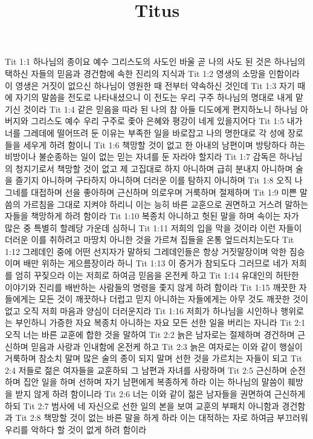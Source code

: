 

\title{Titus}

Tit 1:1  하나님의 종이요 예수 그리스도의 사도인 바울 곧 나의 사도 된 것은 하나님의 택하신 자들의 믿음과 경건함에 속한 진리의 지식과
Tit 1:2  영생의 소망을 인함이라 이 영생은 거짓이 없으신 하나님이 영원한 때 전부터 약속하신 것인데
Tit 1:3  자기 때에 자기의 말씀을 전도로 나타내셨으니 이 전도는 우리 구주 하나님의 명대로 내게 맡기신 것이라
Tit 1:4  같은 믿음을 따라 된 나의 참 아들 디도에게 편지하노니 하나님 아버지와 그리스도 예수 우리 구주로 좇아 은혜와 평강이 네게 있을지어다
Tit 1:5  내가 너를 그레데에 떨어뜨려 둔 이유는 부족한 일을 바로잡고 나의 명한대로 각 성에 장로들을 세우게 하려 함이니
Tit 1:6  책망할 것이 없고 한 아내의 남편이며 방탕하다 하는 비방이나 불순종하는 일이 없는 믿는 자녀를 둔 자라야 할지라
Tit 1:7  감독은 하나님의 청지기로서 책망할 것이 없고 제 고집대로 하지 아니하며 급히 분내지 아니하며 술을 즐기지 아니하며 구타하지 아니하며 더러운 이를 탐하지 아니하며
Tit 1:8  오직 나그네를 대접하며 선을 좋아하며 근신하며 의로우며 거룩하며 절제하며
Tit 1:9  미쁜 말씀의 가르침을 그대로 지켜야 하리니 이는 능히 바른 교훈으로 권면하고 거스려 말하는 자들을 책망하게 하려 함이라
Tit 1:10  복종치 아니하고 헛된 말을 하며 속이는 자가 많은 중 특별히 할례당 가운데 심하니
Tit 1:11  저희의 입을 막을 것이라 이런 자들이 더러운 이를 취하려고 마땅치 아니한 것을 가르쳐 집들을 온통 엎드러치는도다
Tit 1:12  그레데인 중에 어떤 선지자가 말하되 그레데인들은 항상 거짓말장이며 악한 짐승이며 배만 위하는 게으름장이라 하니
Tit 1:13  이 증거가 참되도다 그러므로 네가 저희를 엄히 꾸짖으라 이는 저희로 하여금 믿음을 온전케 하고
Tit 1:14  유대인의 허탄한 이야기와 진리를 배반하는 사람들의 명령을 좇지 않게 하려 함이라
Tit 1:15  깨끗한 자들에게는 모든 것이 깨끗하나 더럽고 믿지 아니하는 자들에게는 아무 것도 깨끗한 것이 없고 오직 저희 마음과 양심이 더러운지라
Tit 1:16  저희가 하나님을 시인하나 행위로는 부인하니 가증한 자요 복종치 아니하는 자요 모든 선한 일을 버리는 자니라
Tit 2:1  오직 너는 바른 교훈에 합한 것을 말하여
Tit 2:2  늙은 남자로는 절제하며 경건하며 근신하며 믿음과 사랑과 인내함에 온전케 하고
Tit 2:3  늙은 여자로는 이와 같이 행실이 거룩하며 참소치 말며 많은 술의 종이 되지 말며 선한 것을 가르치는 자들이 되고
Tit 2:4  저들로 젊은 여자들을 교훈하되 그 남편과 자녀를 사랑하며
Tit 2:5  근신하며 순전하며 집안 일을 하며 선하며 자기 남편에게 복종하게 하라 이는 하나님의 말씀이 훼방을 받지 않게 하려 함이니라
Tit 2:6  너는 이와 같이 젊은 남자들을 권면하여 근신하게 하되
Tit 2:7  범사에 네 자신으로 선한 일의 본을 보여 교훈의 부패치 아니함과 경건함과
Tit 2:8  책망할 것이 없는 바른 말을 하게 하라 이는 대적하는 자로 하여금 부끄러워 우리를 악하다 할 것이 없게 하려 함이라
